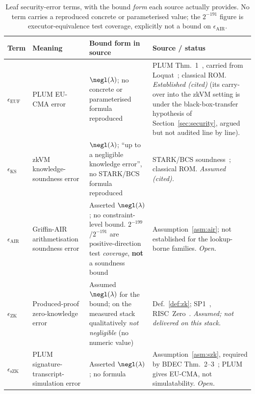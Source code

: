 \begin{table}[t]
\centering
\small
\renewcommand{\arraystretch}{1.3}
\begin{tabular}{@{}p{1.9cm}p{3.4cm}p{3.7cm}p{3.4cm}@{}}
\toprule
\textbf{Term} & \textbf{Meaning} & \textbf{Bound form in source} & \textbf{Source / status} \\
\midrule
$\epsilon_{\mathrm{EUF}}$ &
PLUM EU-CMA error &
$\negl(\lambda)$; no concrete or parameterised formula reproduced &
PLUM Thm.~1~\cite{10.1007/978-981-95-2961-2_6}, carried from Loquat~\cite{cryptoeprint:2024/868}; classical ROM. \emph{Established (cited)} (its carry-over into the zkVM setting is under the black-box-transfer hypothesis of Section~\ref{sec:security}, argued but not audited line by line). \\
$\epsilon_{\mathrm{KS}}$ &
zkVM knowledge-soundness error &
$\negl(\lambda)$; ``up to a negligible knowledge error'', no STARK/BCS formula reproduced &
STARK/BCS soundness~\cite{ethstark,bensasson2016iop}; classical ROM. \emph{Assumed (cited).} \\
$\epsilon_{\mathrm{AIR}}$ &
Griffin-AIR arithmetisation soundness error &
Asserted $\negl(\lambda)$; no constraint-level bound. $2^{-199}$/$2^{-191}$ are positive-direction test \emph{coverage}, \textbf{not} a soundness bound &
Assumption~\ref{asm:air}; not established for the lookup-borne families. \emph{Open.} \\
$\epsilon_{\mathrm{ZK}}$ &
Produced-proof zero-knowledge error &
Assumed $\negl(\lambda)$ for the bound; on the measured stack qualitatively \emph{not negligible} (no numeric value) &
Def.~\ref{def:zk}; SP1~\cite{sp1docs-sec}, RISC~Zero~\cite{risc0zkadvisory,l2beatzk}. \emph{Assumed; not delivered on this stack.} \\
$\epsilon_{\mathrm{sZK}}$ &
PLUM signature-transcript-simulation error &
Asserted $\negl(\lambda)$; no formula &
Assumption~\ref{asm:szk}, required by BDEC Thm.~2--3~\cite{10.1007/978-981-96-0957-4_3}; PLUM gives EU-CMA, not simulatability. \emph{Open.} \\
\bottomrule
\end{tabular}
\caption{Leaf security-error terms, with the bound \emph{form} each source actually provides. No term
carries a reproduced concrete or parameterised value; the $2^{-191}$ figure is executor-equivalence
test coverage, explicitly not a bound on $\epsilon_{\mathrm{AIR}}$.}
\label{tab:leaf-errors}
\end{table}

